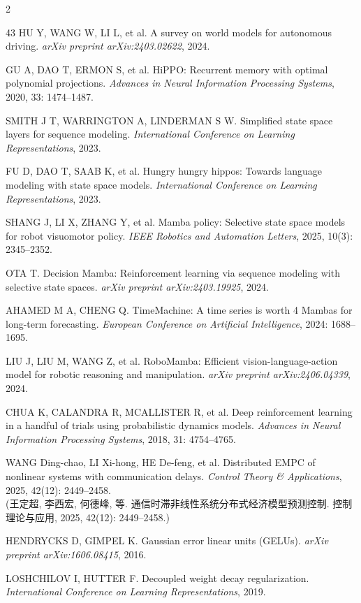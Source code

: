 \begin{multicols}{2}
{\begin{thebibliography}{43}
HU Y, WANG W, LI L, et al. A survey on world models for autonomous driving. {\it arXiv preprint arXiv:2403.02622}, 2024.

GU A, DAO T, ERMON S, et al. HiPPO: Recurrent memory with optimal polynomial projections. {\it Advances in Neural Information Processing Systems}, 2020, 33: 1474--1487.

SMITH J T, WARRINGTON A, LINDERMAN S W. Simplified state space layers for sequence modeling. {\it International Conference on Learning Representations}, 2023.

FU D, DAO T, SAAB K, et al. Hungry hungry hippos: Towards language modeling with state space models. {\it International Conference on Learning Representations}, 2023.

SHANG J, LI X, ZHANG Y, et al. Mamba policy: Selective state space models for robot visuomotor policy. {\it IEEE Robotics and Automation Letters}, 2025, 10(3): 2345--2352.

OTA T. Decision Mamba: Reinforcement learning via sequence modeling with selective state spaces. {\it arXiv preprint arXiv:2403.19925}, 2024.

AHAMED M A, CHENG Q. TimeMachine: A time series is worth 4 Mambas for long-term forecasting. {\it European Conference on Artificial Intelligence}, 2024: 1688--1695.

LIU J, LIU M, WANG Z, et al. RoboMamba: Efficient vision-language-action model for robotic reasoning and manipulation. {\it arXiv preprint arXiv:2406.04339}, 2024.

CHUA K, CALANDRA R, MCALLISTER R, et al. Deep reinforcement learning in a handful of trials using probabilistic dynamics models. {\it Advances in Neural Information Processing Systems}, 2018, 31: 4754--4765.

WANG Ding-chao, LI Xi-hong, HE De-feng, et al. Distributed EMPC of nonlinear systems with communication delays. {\it Control Theory \& Applications}, 2025, 42(12): 2449--2458.\\(王定超, 李西宏, 何德峰, 等. 通信时滞非线性系统分布式经济模型预测控制. 控制理论与应用, 2025, 42(12): 2449--2458.)

HENDRYCKS D, GIMPEL K. Gaussian error linear units (GELUs). {\it arXiv preprint arXiv:1606.08415}, 2016.

LOSHCHILOV I, HUTTER F. Decoupled weight decay regularization. {\it International Conference on Learning Representations}, 2019.


\end{thebibliography}}
\end{multicols}
